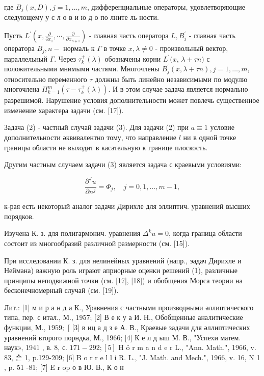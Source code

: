 \documentclass[10pt]{article}
\begin{document}
где $B_{j}(x, D), j=1, \ldots, m$, дифференциальные операторы, удовлетворяющие следующему у с л о в и ю д о по лните ль ности.



Пусть $L^{\prime}\left(x, \frac{\partial}{\partial x_{1}}, \cdots, \frac{\partial}{\partial x_{n+1}}\right)$ - главная часть оператора $L, B_{j}^{\prime}$ - главная часть оператора $B_{j}, n-$ нормаль к $\Gamma$ в точке $x, \lambda \neq 0$ - произвольный вектор, параллельный $\Gamma$. Через $\tau_{k}^{+}(\lambda)$ обозначены корни $L^{\prime}(x$, $\lambda+\tau n)$ с положительными мнимыми частями. Многочлены $B_{j}^{\prime}(x, \lambda+\tau n), j=1, \ldots, m$, относительно переменного $\tau$ должны быть линейно независимыми по модулю многочлена $\Pi_{k=1}^{m}\left(\tau-\tau_{k}^{+}(\lambda)\right)$. И в этом случае задача является нормально разрешимой. Нарушение условия дополнительности может повлечь существенное изменение характера задачи (см. [17]).



Задача (2) - частный случай задачи (3). Для задачи (2) при $a \equiv 1$ условие дополнительности әквивалентно тому, что направление $l$ ни в одной точке границы области не выходит в касательную к границе плоскость.



Другим частным случаем задачи (3) является задача с краевыми условиями:



\[

\frac{\partial^{J} u}{\partial n^{j}}=\Phi_{j}, \quad j=0,1, \ldots, m-1,

\]



к-рая есть некоторый аналог задачи Дирихле для эллиптич. уравнений высших порядков.



Изучена К. з. для полигармонич. уравнения $\Delta^{k} u=0$, когда граница области состоит из многообразий различной размерности (см. [15]).



При исследовании К. з. для нелинейных уравнений (напр., эадач Дирихле и Неймана) важную роль играют априорные оценки решений (1), различные принципы неподвижной точки (см. [17], [18]) и обобщения Морса теории на бесконечномерный случай (см. [19]).



Лит.: [1] м и р а н д а К., Уравнения с частными производными әллиптического типа, пер. с итал., М., 1957; [2] В е к у а И. Н., Обобщенные аналитические функции, М., $1959 ;$ [ [3] в иц а д з е А. В., Краевые задачи для әллиптических уравнений второго порндка, М., 1966; [4] К е л д ыш М. В., "Успехи матем. наук», 1941 , в. 8, с. $171-292 ;[5]$ H ö r m a n d e r L., "Ann. Math.", 1966, v. 83, 슨 1, p.129-209; [6] B o r r e l l i R. L., "J. Math. and Mech.", 1966, v. 16, N 1 , p. 51 -81; [7] E r op о в Ю. В., К о н
\end{document}
